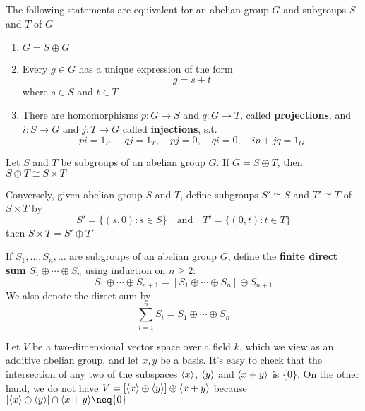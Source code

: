 \documentclass[11pt]{article}
\begin{document}
\begin{proposition}[]
The following statements are equivalent for an abelian group \(G\) and
subgroups \(S\) and \(T\) of \(G\)
\begin{enumerate}
\item \(G=S\oplus G\)
\item Every \(g\in G\) has a unique expression of the form
\begin{equation*}
g=s+t
\end{equation*}
where \(s\in S\) and \(t\in T\)
\item There are homomorphisms \(p:G\to S\) and \(q:G\to T\), called
\textbf{projections}, and \(i:S\to G\) and \(j:T\to G\) called \textbf{injections}, s.t.
\begin{equation*}
pi=1_S,\quad qj=1_T,\quad pj=0,\quad qi=0,\quad ip+jq=1_G
\end{equation*}
\end{enumerate}
\end{proposition}

\begin{corollary}[]
Let \(S\) and \(T\) be subgroups of an abelian group \(G\). If \(G=S\oplus T\),
then \(S\oplus T\cong S\times T\)

Conversely, given abelian group \(S\) and \(T\), define subgroups \(S'\cong S\)
and \(T'\cong T\) of \(S\times T\) by
\begin{equation*}
S'=\{(s,0):s\in S\}\quad\text{and}\quad T'=\{(0,t):t\in T\}
\end{equation*}
then \(S\times T=S'\oplus T'\)
\end{corollary}

\begin{definition}[]
If \(S_1,\dots,S_n,\dots\) are subgroups of an abelian group \(G\), define the
\textbf{finite direct sum} \(S_1\oplus\cdots\oplus S_n\) using induction on
\(n\ge2\):
\begin{equation*}
S_1\oplus\cdots\oplus S_{n+1}=[S_1\oplus\cdots\oplus S_n]\oplus S_{n+1}
\end{equation*}
We also denote the direct sum by
\begin{equation*}
\displaystyle\sum_{i=1}^nS_i=S_1\oplus\cdots\oplus S_n
\end{equation*}
\end{definition}

\begin{examplle}[]
Let \(V\) be a two-dimensional vector space over a field \(k\), which we view as
an additive abelian group, and let \(x,y\) be a basis. It's easy to check
that the intersection of any two of the subspaces \(\langle x\rangle\), 
\(\langle y\rangle\) and \(\langle x+y\rangle\) is \(\{0\}\). On the other hand, we do not
have
\(V=[\langle x\rangle\oplus\langle y\rangle]\oplus\langle x+y\rangle\) because
\([\la x\ra\oplus\la y\ra]\cap\la x+y\ra\neq\{0\}\)
\end{examplle}
\end{document}
